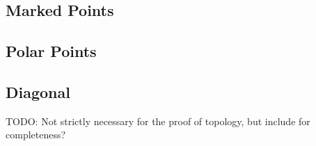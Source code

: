 \subsection{Marked Points}
\label{sub:Marked Points}

\subsection{Polar Points}
\label{sub:Polar Points}

\subsection{Diagonal}
\label{sub:Diagonal}

TODO: Not strictly necessary for the proof of topology, but include for completeness?
